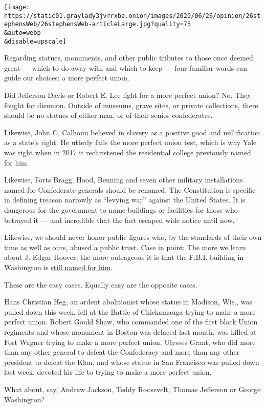 \texttt{[image: https://static01.graylady3jvrrxbe.onion/images/2020/06/26/opinion/26stephensWeb/26stephensWeb-articleLarge.jpg?quality=75\\\&auto=webp\\\&disable=upscale]}

Regarding statues, monuments, and other public tributes to those once
deemed great --- which to do away with and which to keep --- four
familiar words can guide our choices: a more perfect union.

Did Jefferson Davis or Robert E. Lee fight for a more perfect union? No.
They fought for disunion. Outside of museums, grave sites, or private
collections, there should be no statues of either man, or of their
senior confederates.

Likewise, John C. Calhoun believed in slavery as a positive good and
nullification as a state's right. He utterly fails the more perfect
union test, which is why Yale was right when in 2017 it rechristened the
residential college previously named for him.

Likewise, Forts Bragg, Hood, Benning and seven other military
installations named for Confederate generals should be renamed. The
Constitution is specific in defining treason narrowly as ``levying war''
against the United States. It is dangerous for the government to name
buildings or facilities for those who betrayed it --- and incredible
that the fact escaped wide notice until now.

Likewise, we should never honor public figures who, by the standards of
their own time as well as ours, abused a public trust. Case in point:
The more we learn about J. Edgar Hoover, the more outrageous it is that
the F.B.I. building in Washington is
\href{https://www.wsj.com/articles/SB112182505647390371}{still named for
him}.

These are the easy cases. Equally easy are the opposite cases.

Hans Christian Heg, an ardent abolitionist whose statue in Madison,
Wis., was pulled down this week, fell at the Battle of Chickamauga
trying to make a more perfect union. Robert Gould Shaw, who commanded
one of the first black Union regiments and whose monument in Boston was
defaced last month, was killed at Fort Wagner trying to make a more
perfect union. Ulysses Grant, who did more than any other general to
defeat the Confederacy and more than any other president to defeat the
Klan, and whose statue in San Francisco was pulled down last week,
devoted his life to trying to make a more perfect union.

What about, say, Andrew Jackson, Teddy Roosevelt, Thomas Jefferson or
George Washington?

